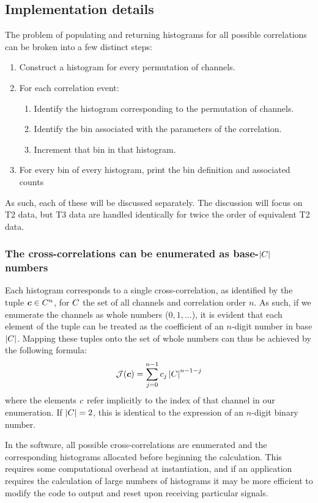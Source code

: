 \subsection{Implementation details}
The problem of populating and returning histograms for all possible correlations can be broken into a few distinct steps:
\begin{enumerate}
\item Construct a histogram for every permutation of channels.
\item For each correlation event:
  \begin{enumerate}
  \item Identify the histogram corresponding to the permutation of channels.
  \item Identify the bin associated with the parameters of the correlation.
  \item Increment that bin in that histogram.
  \end{enumerate}
\item For every bin of every histogram, print the bin definition and associated counts
\end{enumerate}
As such, each of these will be discussed separately. The discussion will focus on T2 data, but T3 data are handled identically for twice the order of equivalent T2 data.

\subsubsection{The cross-correlations can be enumerated as base-$\left|C\right|$ numbers}
Each histogram corresponds to a single cross-correlation, as identified by the tuple $\boldsymbol{c}\in C^{n}$, for $C$ the set of all channels and correlation order $n$. As such, if we enumerate the channels as whole numbers ($0, 1, \ldots$), it is evident that each element of the tuple can be treated as the coefficient of an $n$-digit number in base $\left|C\right|$. Mapping these tuples onto the set of whole numbers can thus be achieved by the following formula:
\begin{equation}
\mathcal{J}(\boldsymbol{c}) = \sum_{j=0}^{n-1}{c_{j}\left|C\right|^{n-1-j}}
\end{equation}
where the elements $c$ refer implicitly to the index of that channel in our enumeration.
If $\left|C\right|=2$, this is identical to the expression of an $n$-digit binary number.

In the software, all possible cross-correlations are enumerated and the corresponding histograms allocated before beginning the calculation. This requires some computational overhead at instantiation, and if an application requires the calculation of large numbers of histograms it may be more efficient to modify the code to output and reset upon receiving particular signals.

